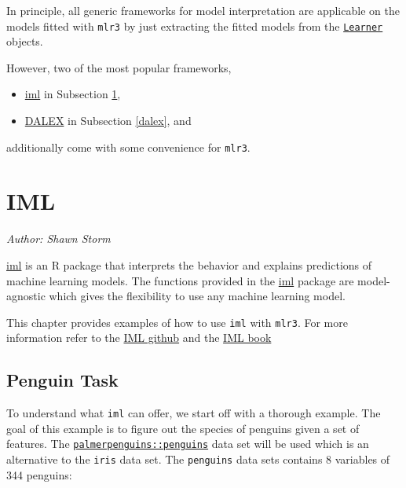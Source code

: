 \documentclass[
]{scrbook}
\providecommand{\tightlist}{%
  \setlength{\itemsep}{0pt}\setlength{\parskip}{0pt}}
\begin{document}
In principle, all generic frameworks for model interpretation are applicable on the models fitted with \texttt{mlr3} by just extracting the fitted models from the \href{https://mlr3.mlr-org.com/reference/Learner.html}{\texttt{Learner}} objects.

However, two of the most popular frameworks,

\begin{itemize}
\tightlist
\item
  \href{https://cran.r-project.org/package=iml}{iml} in Subsection \ref{iml},
\item
  \href{https://cran.r-project.org/package=DALEX}{DALEX} in Subsection \ref{dalex}, and
\end{itemize}

additionally come with some convenience for \texttt{mlr3}.

\hypertarget{iml}{%
\section{IML}\label{iml}}

\emph{Author: Shawn Storm}

\href{https://cran.r-project.org/package=iml}{iml} is an R package that interprets the behavior and explains predictions of machine learning models. The functions provided in the \href{https://cran.r-project.org/package=iml}{iml} package are model-agnostic which gives the flexibility to use any machine learning model.

This chapter provides examples of how to use \texttt{iml} with \texttt{mlr3}. For more information refer to the \href{https://github.com/christophM/iml}{IML github} and the \href{https://christophm.github.io/interpretable-ml-book/}{IML book}

\hypertarget{penguin-task}{%
\subsection{Penguin Task}\label{penguin-task}}

To understand what \texttt{iml} can offer, we start off with a thorough example. The goal of this example is to figure out the species of penguins given a set of features. The \href{https://www.rdocumentation.org/packages/palmerpenguins/topics/penguins}{\texttt{palmerpenguins::penguins}} data set will be used which is an alternative to the \texttt{iris} data set.
The \texttt{penguins} data sets contains 8 variables of 344 penguins:
\end{document}
